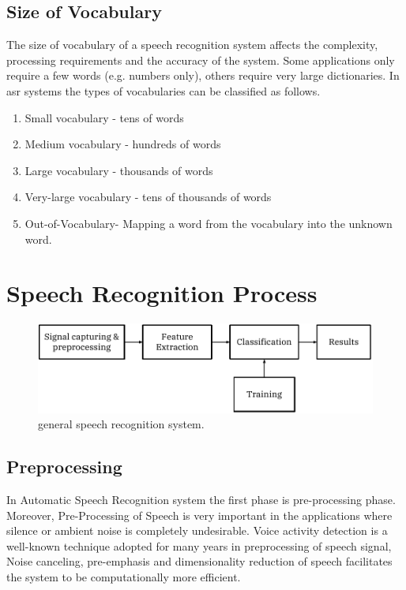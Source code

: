 \documentclass[12pt, a4paper, twoside]{report}
\begin{document}
\subsection{Size of Vocabulary}
The size of vocabulary of a speech recognition system affects the complexity, processing requirements and the accuracy of the system. Some applications only require a few words (e.g. numbers only), others require very large dictionaries. In \acrshort{asr} systems the types of vocabularies can be classified as follows.
\begin{enumerate}
\item Small vocabulary - tens of words
\item Medium vocabulary - hundreds of words
\item Large vocabulary - thousands of words
\item Very-large vocabulary - tens of thousands of words
\item Out-of-Vocabulary- Mapping a word from the vocabulary into the unknown word.
\end{enumerate}
\section{Speech Recognition Process}

\begin{figure}[ht]
	\centering
	\includegraphics[width=1\textwidth]
	{images/chapter1/chapter1}
	\caption{general speech recognition system.}
	\label{fig:chapter1}
\end{figure}

\subsection{Preprocessing}
In Automatic Speech Recognition system the first phase is pre-processing phase. Moreover, Pre-Processing of Speech is very important in the applications where silence or ambient noise is completely undesirable. Voice activity detection is a well-known technique adopted for many years in preprocessing of speech signal, Noise canceling, pre-emphasis and dimensionality reduction of speech facilitates the system to be computationally more efficient.
\end{document}
